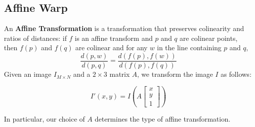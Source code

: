 \subsection{Affine Warp}

An \textbf{Affine Transformation} is a transformation that preserves colinearity and ratios of distances: if $f$ is an affine transform and $p$ and $q$ are colinear points, then $f(p)$ and $f(q)$ are colinear and for any $w$ in the line containing $p$ and $q$, \[\frac{d(p, w)}{d(p,q)}=\frac{d(f(p), f(w))}{d(f(p),f(q))}\] Given an image $I_{M\times N}$ and a $2\times3$ matrix $A$, we transform the image $I$ as follows:

\[I'(x, y) = I\left(A\begin{bmatrix}x \\ y \\ 1\end{bmatrix}\right)\]

In particular, our choice of $A$ determines the type of affine transformation. 